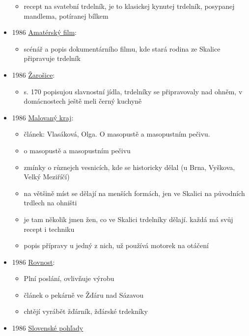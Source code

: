 \begin{itemize}
  \begin{itemize}
  \tightlist
  \item
    recept na svatební trdelník, je to klasickej kynutej trdelník,
    posypanej mandlema, potíranej bílkem
  \end{itemize}
\item
  1986
  \href{https://ceskadigitalniknihovna.cz/uuid/uuid:6c7effb0-14fa-11e5-b9a6-5ef3fc9ae867}{Amatérský
  film}:

  \begin{itemize}
  \tightlist
  \item
    scénář a popis dokumentárního filmu, kde stará rodina ze Skalice
    připravuje trdelník
  \end{itemize}
\item
  1986
  \href{https://ceskadigitalniknihovna.cz/uuid/uuid:efea92f0-525a-11e5-a788-0050569d679d}{Žarošice}:

  \begin{itemize}
  \tightlist
  \item
    s. 170 popisujou slavnostní jídla, trdelníky se připravovaly nad
    ohněm, v domácnostech ještě meli černý kuchyně
  \end{itemize}
\item
  1986
  \href{https://ndk.cz/uuid/uuid:c91c2e60-1d1a-11e4-a8ab-001018b5eb5c}{Malovaný
  kraj}:

  \begin{itemize}
  \tightlist
  \item
    článek: Vlasáková, Olga. O masopustě a masopustním pečivu.
  \item
    o masopustě a masopustním pečivu
  \item
    zmínky o různejch vesnicích, kde se historicky dělal (u Brna,
    Vyškova, Velký Meziříčí)
  \item
    na většině míst se dělají na menších formách, jen ve Skalici na
    původních trdlech na ohništi
  \item
    je tam několik jmen žen, co ve Skalici trdelníky dělají. každá má
    svůj recept i techniku
  \item
    popis přípravy u jedný z nich, už používá motorek na otáčení
  \end{itemize}
\item
  1986
  \href{https://ndk.cz/uuid/uuid:882d50d0-42f4-11f0-9463-005056825209}{Rovnost}:

  \begin{itemize}
  \tightlist
  \item
    Plní poslání, ovlivňuje výrobu
  \item
    článek o pekárně ve Žďáru nad Sázavou
  \item
    chtějí vyrábět žďárník, žďárské trdekníky
  \end{itemize}
\item
  1986
  \href{https://dikda.snk.sk/uuid/uuid:bcfbf53a-ce88-41a9-9e57-676c018f79a7}{Slovenské
  pohľady}


\end{itemize}
